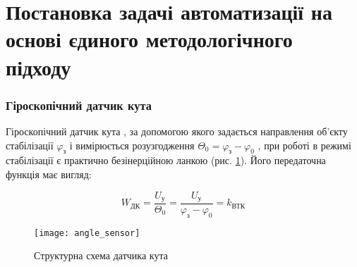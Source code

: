 \section{Постановка задачі автоматизації на основі єдиного методологічного підходу}

\subsubsection{Гіроскопічний датчик кута}

Гіроскопічний датчик кута , 
за допомогою якого задається направлення об’єкту 
стабілізації $\varphi_\text{з}$ і вимірюється розузгодження 
$\Theta_0 = \varphi_\text{з} - \varphi_0$ , при роботі в режимі стабілізації 
є практично безінерційною ланкою (рис. \ref{fig:angle sensor}). Його передаточна 
функція має вигляд:

$$ W_\text{ДК} = \frac{U_\text{у}}{\Theta_0} = \frac{U_\text{у}}{\varphi_\text{з} - \varphi_0} = k_\text{ВТК} $$

\begin{figure}
\centering
\texttt{[image: angle\_sensor]}
\caption{Структурна схема датчика кута}
\label{fig:angle sensor}
\end{figure} 

